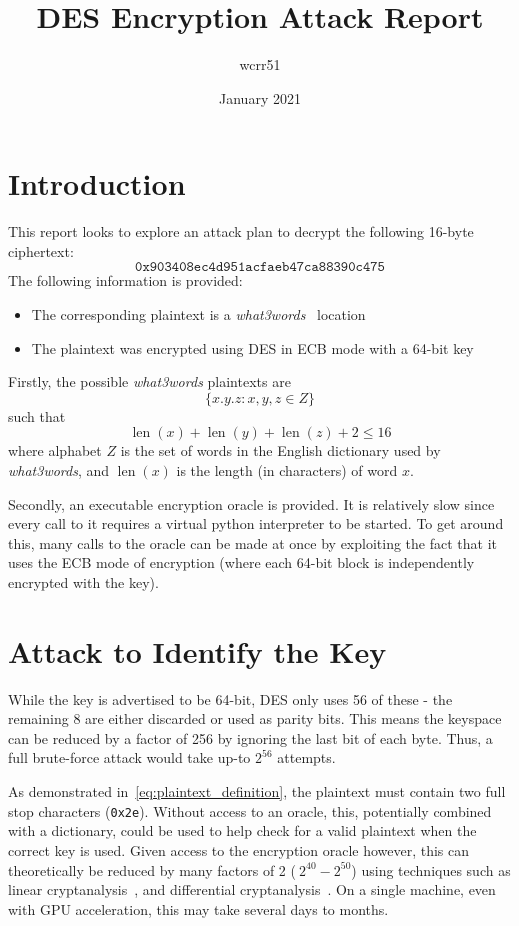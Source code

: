 \documentclass[11pt]{article}
\title{\vspace{-2cm}DES Encryption Attack Report}
\author{wcrr51}
\date{January 2021}
\DeclareMathOperator{\len}{len}
\begin{document}
    \maketitle

    \section{Introduction}\label{sec:introduction}
    This report looks to explore an attack plan to decrypt the following 16-byte ciphertext:
    \[\texttt{0x903408ec4d951acfaeb47ca88390c475} \tag{1}\label{eq:ciphertext}\]
    The following information is provided:
    \begin{itemize}
        \item The corresponding plaintext is a \textit{what3words}~\cite{what3words} location
        \item The plaintext was encrypted using DES in ECB mode with a 64-bit key
    \end{itemize}

    Firstly, the possible \textit{what3words} plaintexts are
    \[\{x.y.z : x, y, z \in Z\}\tag{2}\label{eq:plaintext_definition}\]
    such that
    \[\len(x) + \len(y) + \len(z) + 2 \leq 16 \tag{3}\label{eq:word_constraint}\]
    where alphabet $Z$ is the set of words in the English dictionary used by \textit{what3words}, and $\len(x)$ is the length (in characters) of word $x$.

    Secondly, an executable encryption oracle is provided.
    It is relatively slow since every call to it requires a virtual python interpreter to be started.
    To get around this, many calls to the oracle can be made at once by exploiting the fact that it uses the ECB mode of encryption (where each 64-bit block is independently encrypted with the key).


    \section{Attack to Identify the Key}\label{sec:key-identification-attack}
    While the key is advertised to be 64-bit, DES only uses 56 of these - the remaining 8 are either discarded or used as parity bits.
    This means the keyspace can be reduced by a factor of 256 by ignoring the last bit of each byte.
    Thus, a full brute-force attack would take up-to $2^{56}$ attempts.

    As demonstrated in~\eqref{eq:plaintext_definition}, the plaintext must contain two full stop characters (\texttt{0x2e}).
    Without access to an oracle, this, potentially combined with a dictionary, could be used to help check for a valid plaintext when the correct key is used.
    Given access to the encryption oracle however, this can theoretically be reduced by many factors of 2 ($~2^{40}-2^{50}$) using techniques such as linear cryptanalysis~\cite{matsui1993linear}, and differential cryptanalysis~\cite{biham1992differential}.
    On a single machine, even with GPU acceleration, this may take several days to months.
\end{document}
